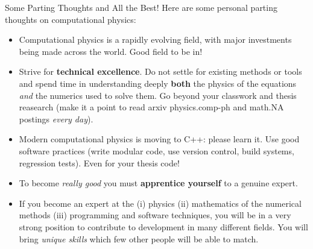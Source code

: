 \documentclass[pdf]{beamer}
\theoremstyle{definition}
\begin{document}
\begin{frame}{Some Parting Thoughts and All the Best!}
  \small
  Here are some personal parting thoughts on computational physics:
  \begin{itemize}
  \item Computational physics is a rapidly evolving field, with major
    investments being made across the world. Good field to be in!
  \item Strive for {\bf technical excellence}. Do not settle for
    existing methods or tools and spend time in understanding deeply
    {\bf both} the physics of the equations \emph{and} the numerics
    used to solve them. Go beyond your classwork and thesis reasearch
    (make it a point to read arxiv physics.comp-ph and math.NA
    postings \emph{every day}).
  \item Modern computational physics is moving to C++: please learn
    it. Use good software practices (write modular code, use version
    control, build systems, regression tests). Even for your thesis
    code!
  \item To become \emph{really good} you must {\bf apprentice
      yourself} to a genuine expert.
  \item If you become an expert at the (i) physics (ii) mathematics of
    the numerical methods (iii) programming and software techniques,
    you will be in a very strong position to contribute to development
    in many different fields. You will bring \emph{unique skills}
    which few other people will be able to match.
  \end{itemize}
\end{frame}
\end{document}

